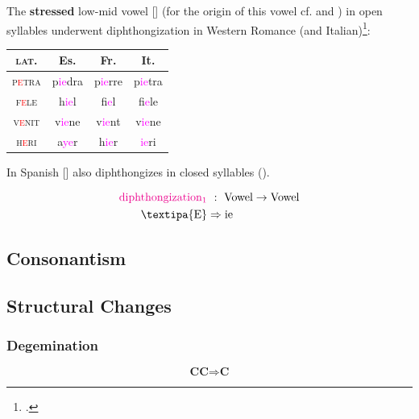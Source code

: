 \documentclass{report}[12pt]
\begin{document}
The \textbf{stressed} low-mid vowel [] (for the origin of this vowel cf.  and ) in open syllables underwent diphthongization in Western Romance (and Italian)\footcite[p.~15-16]{romance_his}:
\begin{center}
  \begin{tabular}{c c c c}
    \textsc{lat.} & Es. & Fr. & It. \\
    \hline
    \textsc{p\textcolor{red}{e}tra} & p\textcolor{magenta}{ie}dra & p\textcolor{magenta}{ie}rre & p\textcolor{magenta}{ie}tra \\
    \textsc{f\textcolor{red}{e}le} & h\textcolor{magenta}{ie}l & f\textcolor{magenta}{ie}l & f\textcolor{magenta}{ie}le \\
    \textsc{v\textcolor{red}{e}nit} & v\textcolor{magenta}{ie}ne & v\textcolor{magenta}{ie}nt & v\textcolor{magenta}{ie}ne \\
    \textsc{h\textcolor{red}{e}ri} & a\textcolor{magenta}{ye}r & h\textcolor{magenta}{ie}r & \textcolor{magenta}{ie}ri \\
  \end{tabular}
\end{center}
In Spanish [] also diphthongizes in closed syllables ().

\begin{tcolorbox}
  \begin{align*}
    \text{\textcolor{magenta}{diphthongization$_1$}} &\ :\ \text{Vowel} \rightarrow \text{Vowel} \\
    \text{\textipa{E}} & \Rightarrow \text{ie} \\
  \end{align*}
\end{tcolorbox}

\subsection{Consonantism}

\subsection{Structural Changes}

\subsubsection{Degemination}

\begin{tcolorbox}
  \[ \textbf{CC} \Rightarrow \textbf{C} \]
\end{tcolorbox}
\end{document}

